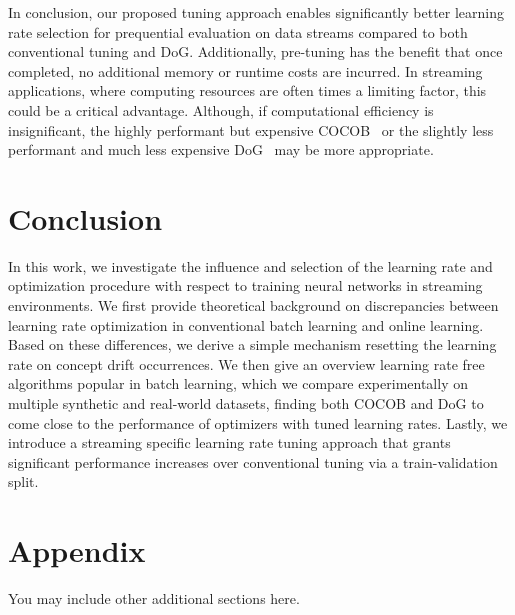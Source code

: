 \documentclass{article} %
\begin{document}
In conclusion, our proposed tuning approach enables significantly better learning rate selection for prequential evaluation on data streams compared to both conventional tuning and DoG.
Additionally, pre-tuning has the benefit that once completed, no additional memory or runtime costs are incurred.
In streaming applications, where computing resources are often times a limiting factor, this could be a critical advantage.
Although, if computational efficiency is insignificant, the highly performant but expensive COCOB~\citep{orabonaTrainingDeepNetworks2017} or the slightly less performant and much less expensive DoG~\citep{ivgiDoGSGDBest2023} may be more appropriate.


\section{Conclusion}

In this work, we investigate the influence and selection of the learning rate and optimization procedure with respect to training neural networks in streaming environments.
We first provide theoretical background on discrepancies between learning rate optimization in conventional batch learning and online learning.
Based on these differences, we derive a simple mechanism resetting the learning rate on concept drift occurrences.
We then give an overview learning rate free algorithms popular in batch learning, which we compare experimentally on multiple synthetic and real-world datasets,
finding both COCOB and DoG to come close to the performance of optimizers with tuned learning rates.
Lastly, we introduce a streaming specific learning rate tuning approach that grants significant performance increases over conventional tuning via a train-validation split.




\appendix
\section{Appendix}
You may include other additional sections here.
\end{document}
